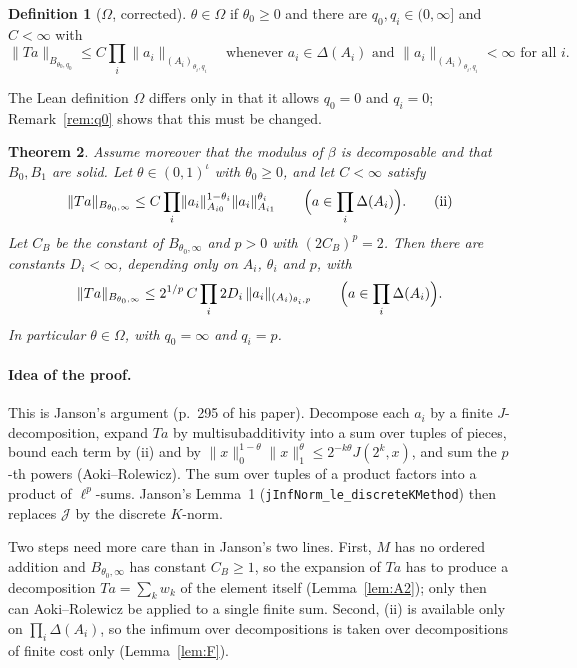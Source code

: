 \documentclass[11pt]{article}
\newtheorem{theorem}{Theorem}
\theoremstyle{definition}
\newtheorem{definition}[theorem]{Definition}
\theoremstyle{remark}
\newcommand{\norm}[2]{\lVert #1\rVert_{#2}}
\newcommand{\cJ}{\mathcal J}
\begin{document}
\begin{definition}[\(\Omega\), corrected]\label{def:Omega}
  \(\theta\in\Omega\) if \(\theta_0 \ge 0\) and there are \(q_0, q_i \in (0,\infty]\) and
  \(C<\infty\) with
  \[
    \norm{Ta}{B_{\theta_0,q_0}} \le C\prod_i \norm{a_i}{(A_i)_{\theta_i,q_i}}
    \quad\text{whenever } a_i\in\Delta(A_i) \text{ and } \norm{a_i}{(A_i)_{\theta_i,q_i}} < \infty
    \text{ for all } i.
  \]
\end{definition}

The Lean definition \texttt{\(\Omega\)} differs only in that it allows \(q_0 = 0\) and
\(q_i = 0\); Remark~\ref{rem:q0} shows that this must be changed.

\begin{theorem}\label{thm:main}
  Assume moreover that the modulus of \(\beta\) is decomposable and that \(B_0, B_1\) are solid.
  Let \(\theta\in(0,1)^\iota\) with \(\theta_0\ge0\), and let \(C<\infty\) satisfy
  \begin{equation}\label{eq:ii}
    \norm{Ta}{B_{\theta_0,\infty}} \le C\prod_i \norm{a_i}{A_{i0}}^{1-\theta_i}\norm{a_i}{A_{i1}}^{\theta_i}
    \qquad\Bigl(a\in\prod_i\Delta(A_i)\Bigr). \tag{ii}
  \end{equation}
  Let \(C_B\) be the constant of \(B_{\theta_0,\infty}\) and \(p>0\) with \((2C_B)^p = 2\).
  Then there are constants \(D_i<\infty\), depending only on \(A_i\), \(\theta_i\) and \(p\), with
  \[
    \norm{Ta}{B_{\theta_0,\infty}} \le 2^{1/p}\, C \prod_i 2D_i\,\norm{a_i}{(A_i)_{\theta_i,p}}
    \qquad\Bigl(a\in\prod_i\Delta(A_i)\Bigr).
  \]
  In particular \(\theta\in\Omega\), with \(q_0 = \infty\) and \(q_i = p\).
\end{theorem}

\paragraph{Idea of the proof.}
This is Janson's argument (p.~295 of his paper). Decompose each \(a_i\) by a finite
\(J\)-decomposition, expand \(Ta\) by multisubadditivity into a sum over tuples of pieces,
bound each term by (ii) and by \(\norm{x}{0}^{1-\theta}\norm{x}{1}^{\theta} \le
2^{-k\theta}J(2^k,x)\), and sum the \(p\)-th powers (Aoki--Rolewicz). The sum over tuples of
a product factors into a product of \(\ell^p\)-sums. Janson's Lemma~1
(\texttt{jInfNorm\_le\_discreteKMethod}) then replaces \(\cJ\) by the discrete \(K\)-norm.

Two steps need more care than in Janson's two lines. First, \(M\) has no ordered addition and
\(B_{\theta_0,\infty}\) has constant \(C_B \ge 1\), so the expansion of \(Ta\) has to produce
a decomposition \(Ta = \sum_k w_k\) of the element itself (Lemma~\ref{lem:A2}); only then can
Aoki--Rolewicz be applied to a single finite sum. Second, (ii) is available only on
\(\prod_i\Delta(A_i)\), so the infimum over decompositions is taken over decompositions of
finite cost only (Lemma~\ref{lem:F}).
\end{document}
